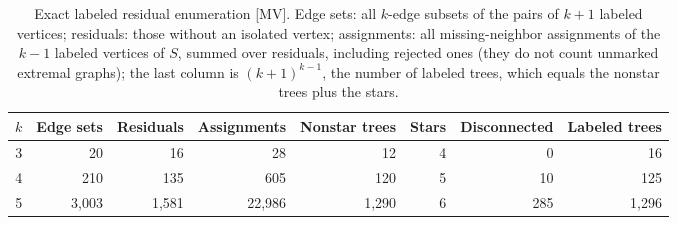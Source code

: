 \begin{table}[ht]
\centering\small
\setlength{\tabcolsep}{4pt}
\begin{tabular}{rrrrrrrr}
\toprule
$k$ & Edge sets & Residuals & Assignments & Nonstar trees & Stars & Disconnected & Labeled trees\\
\midrule
3 & 20 & 16 & 28 & 12 & 4 & 0 & 16\\
4 & 210 & 135 & 605 & 120 & 5 & 10 & 125\\
5 & 3{,}003 & 1{,}581 & 22{,}986 & 1{,}290 & 6 & 285 & 1{,}296\\
\bottomrule
\end{tabular}
\caption{Exact labeled residual enumeration [MV]. Edge sets: all $k$-edge subsets of the pairs of $k+1$ labeled vertices; residuals: those without an isolated vertex; assignments: all missing-neighbor assignments of the $k-1$ labeled vertices of $S$, summed over residuals, including rejected ones (they do not count unmarked extremal graphs); the last column is $(k+1)^{k-1}$, the number of labeled trees, which equals the nonstar trees plus the stars.}
\label{tab:residual}
\end{table}
